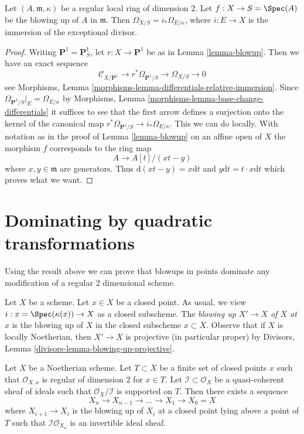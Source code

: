 \begin{lemma}
\label{lemma-differentials-of-blowup}
Let $(A, \mathfrak m, \kappa)$ be a regular local ring of dimension $2$.
Let $f : X \to S = \Spec(A)$ be the blowing up of $A$ in $\mathfrak m$.
Then $\Omega_{X/S} = i_*\Omega_{E/\kappa}$, where $i : E \to X$
is the immersion of the exceptional divisor.
\end{lemma}

\begin{proof}
Writing $\mathbf{P}^1 = \mathbf{P}^1_S$, let
$r : X \to \mathbf{P}^1$ be as in Lemma \ref{lemma-blowup}.
Then we have an exact sequence
$$
\mathcal{C}_{X/\mathbf{P}^1} \to r^*\Omega_{\mathbf{P}^1/S} \to
\Omega_{X/S} \to 0
$$
see Morphisms, Lemma \ref{morphisms-lemma-differentials-relative-immersion}.
Since $\Omega_{\mathbf{P}^1/S}|_E = \Omega_{E/\kappa}$ by
Morphisms, Lemma \ref{morphisms-lemma-base-change-differentials}
it suffices to see that the first arrow defines a surjection
onto the kernel of the canonical map
$r^*\Omega_{\mathbf{P}^1/S} \to i_*\Omega_{E/\kappa}$.
This we can do locally. With notation as in the proof of
Lemma \ref{lemma-blowup} on an affine open of $X$ the morphism $f$
corresponds to the ring map
$$
A \to A[t]/(xt - y)
$$
where $x, y \in \mathfrak m$ are generators. Thus
$\text{d}(xt - y) = x\text{d}t$ and $y\text{d}t = t \cdot x \text{d}t$
which proves what we want.
\end{proof}



\section{Dominating by quadratic transformations}
\label{section-dominating-by-quadratic}

\noindent
Using the result above we can prove that blowups in points dominate
any modification of a regular $2$ dimensional scheme.

\medskip\noindent
Let $X$ be a scheme. Let $x \in X$ be a closed point. As usual, we view
$i : x = \Spec(\kappa(x)) \to X$ as a closed subscheme.
The {\it blowing up $X' \to X$ of $X$ at $x$} is the blowing up of $X$
in the closed subscheme $x \subset X$. Observe that if $X$ is locally
Noetherian, then $X' \to X$ is projective (in particular proper) by
Divisors, Lemma \ref{divisors-lemma-blowing-up-projective}.

\begin{lemma}
\label{lemma-make-ideal-principal}
Let $X$ be a Noetherian scheme. Let $T \subset X$ be a finite set of
closed points $x$ such that $\mathcal{O}_{X, x}$ is
regular of dimension $2$ for $x \in T$.
Let $\mathcal{I} \subset \mathcal{O}_X$ be a quasi-coherent
sheaf of ideals such that $\mathcal{O}_X/\mathcal{I}$ is supported
on $T$.
Then there exists a sequence
$$
X_n \to X_{n - 1} \to \ldots \to X_1 \to X_0 = X
$$
where $X_{i + 1} \to X_i$ is the blowing up of $X_i$ at a closed
point lying above a point of $T$ such that
$\mathcal{I}\mathcal{O}_{X_n}$ is an invertible ideal sheaf.
\end{lemma}

